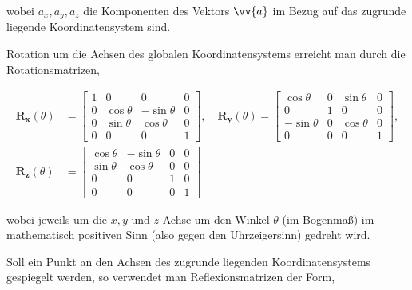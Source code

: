wobei \( a_x, a_y, a_z \) die Komponenten des Vektors \( \vv{a} \) im Bezug auf das zugrunde liegende Koordinatensystem sind.

Rotation um die Achsen des globalen Koordinatensystems erreicht man durch die Rotationsmatrizen,

\begin{align*}
    \boldsymbol{R_x}(\theta) &= 
    \begin{bmatrix}
        1 & 0 & 0 & 0 \\
        0 & \cos \theta & - \sin \theta & 0 \\
        0 & \sin \theta & \cos \theta & 0 \\
        0 & 0 & 0 & 1
    \end{bmatrix}, \quad
    \boldsymbol{R_y}(\theta) = 
    \begin{bmatrix}
        \cos \theta & 0 & \sin \theta & 0 \\
        0 & 1 & 0 & 0 \\
        - \sin \theta & 0 & \cos \theta & 0 \\
        0 & 0 & 0 & 1
    \end{bmatrix}, \\
    \boldsymbol{R_z}(\theta) &= 
    \begin{bmatrix}
        \cos \theta & - \sin \theta & 0 & 0 \\
        \sin \theta & \cos \theta & 0 & 0 \\
        0 & 0 & 1 & 0 \\
        0 & 0 & 0 & 1
    \end{bmatrix}
\end{align*}

wobei jeweils um die \( x, y \text{ und } z \) Achse um den Winkel \( \theta \) (im Bogenmaß) im mathematisch positiven Sinn (also gegen den Uhrzeigersinn) gedreht wird.

Soll ein Punkt an den Achsen des zugrunde liegenden Koordinatensystems gespiegelt werden, so verwendet man Reflexionsmatrizen der Form,

